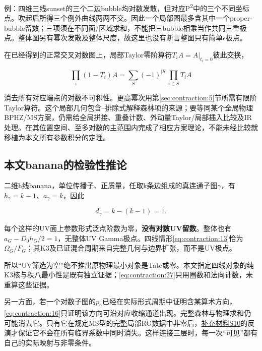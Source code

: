 \documentclass[11pt,a4paper,oneside]{ctexart}
\theoremstyle{cnplain}
\theoremstyle{definition}
\theoremstyle{remark}
\numberwithin{equation}{section}
\newcommand{\otherref}[2]{\href{#1.pdf}{#2}}
\begin{document}
例：四维三线sunset的三个二边bubble均对数发散，但对应P\textsuperscript{2}中的三个不同坐标点。吹起后所得三个例外曲线两两不交。因此一个局部图最多含其中一个proper-bubble留数；三项须在不同面/区域求和，不能把三bubble相乘当作共同三重极点。整体图另有幂次发散及整体尺度，故这里也没有断言整图只有简单\(\epsilon \)极点。

在已经得到的正常交叉对数图上，局部Taylor零阶算符\(T_i A=A|_{t_i=0}\)彼此交换，

\begin{equation}
\prod_i(1-T_i)A=\sum_{S}(-1)^{|S|}\prod_{i\in S}T_i A          \label{eq:contraction:26}
\end{equation}

消去所有对应端点的对数不可积性。更高幂次用第\ref{sec:contraction:5}节所需有限阶Taylor算符。这个局部几何包含--排除式解释森林项的来源；要等同某个全局物理BPHZ/MS方案，仍需给全局拼接、重叠计数、外动量Taylor/局部插入比较及IR处理。\cite{bbr}在其位置空间、至多对数的主范围内完成了相应方案理论，不能未经比较就移植为本文所有参数积分的定理。


\subsection{本文banana的检验性推论}\label{sec:contraction:8}

二维h线banana，单位传播子、正质量，任取k条边组成的真连通子图\(\gamma \)，有\(h_\gamma =k- 1\)、\(a_\gamma =k\)，因此

\begin{equation}
d_\gamma=k-(k-1)=1.                \label{eq:contraction:27}
\end{equation}

每个这样的UV面上参数形式泛点阶数为零，\textbf{没有对数UV留数}。整体也有\(a_G- D_0h_G/2=1\)，无整体UV Gamma极点。四线情形\eqref{eq:contraction:13}恰为\(\Omega _G/F_G\)；其K3及已证混合周期来自完整几何与边界扩张，而不是UV极点。

所以``UV筛选为空''绝不推出原物理最小对象是Tate或零。本文指定四线对象的纯K3核与秩八最小性是既有独立证据；\eqref{eq:contraction:27}只用圈数和法向计数，未重算这些证据。

另一方面，若一个对数子图的\(p_\gamma \)已经在实际形式周期中证明含某算术方向，\eqref{eq:contraction:16}只证明该方向可沿对应收缩通道出现。完整森林与物理求和仍可能消去它。只有它在规定MS型的完整局部RG数据中非零后，\otherref{feynman_periods_supplement}{补充材料S10}的反演才保证它不会在所有临界系数中同时消失。这样连接三层时，每一次``可见''都有自己的实际映射与非零条件。
\end{document}
